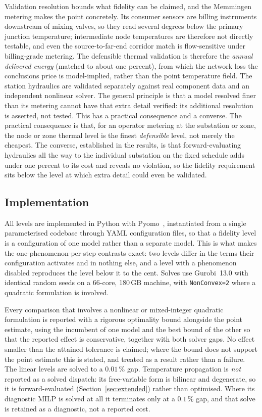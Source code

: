 \documentclass[a4paper,fleqn]{cas-sc}
\begin{document}
Validation resolution bounds what fidelity can be claimed, and the Memmingen metering makes the
point concretely. Its consumer sensors are billing instruments downstream of mixing valves, so
they read several degrees below the primary junction temperature; intermediate node temperatures
are therefore not directly testable, and even the source-to-far-end corridor match is
flow-sensitive under billing-grade metering. The defensible thermal validation is therefore the
\emph{annual delivered energy} (matched to about one percent), from which the network loss the
conclusions price is model-implied, rather than the point temperature field. The station hydraulics are validated separately against real component data and an
independent nonlinear solver. The general principle is that a model resolved finer than its
metering cannot have that extra detail verified: its additional resolution is asserted, not
tested. This has a practical
consequence and a converse. The practical consequence is that, for an operator metering at the
substation or zone, the node or zone thermal level is the finest \emph{defensible} level, not
merely the cheapest. The converse, established in the results, is that forward-evaluating
hydraulics all the way to the individual substation on the fixed schedule adds under one percent
to its cost and reveals no violation, so the fidelity requirement sits below the level at which
extra detail could even be validated.

\subsection{Implementation}

All levels are implemented in Python with Pyomo~\cite{pyomo}, instantiated from a single
parameterised codebase through YAML configuration files, so that a fidelity level is a
configuration of one model rather than a separate model. This is what makes the
one-phenomenon-per-step contrasts exact: two levels differ in the terms their configuration
activates and in nothing else, and a level with a phenomenon disabled reproduces the level
below it to the cent. Solves use Gurobi~13.0 with identical random seeds on a 66-core,
180\,GB machine, with \texttt{NonConvex=2} where a quadratic formulation is involved.

Every comparison that involves a nonlinear or mixed-integer quadratic formulation is reported
with a rigorous optimality bound alongside the point estimate, using the incumbent of one model
and the best bound of the other so that the reported effect is conservative, together with both
solver gaps. No effect smaller than the attained tolerance is claimed; where the bound does not
support the point estimate this is stated, and treated as a result rather than a failure. The
linear levels are solved to a $0.01$\,\% gap. Temperature propagation is \emph{not} reported as
a solved dispatch: its free-variable form is bilinear and degenerate, so it is forward-evaluated
(Section~\ref{sec:extended}) rather than optimised. Where its diagnostic MILP is solved at all it
terminates only at a $0.1$\,\% gap, and that solve is retained as a diagnostic, not a reported
cost.
\end{document}
